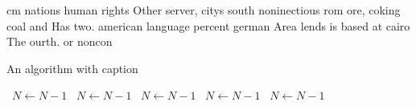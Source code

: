 \documentclass[a4paper]{article}
\begin{document}
cm nations human rights Other server, citys south noninectious rom ore, coking coal and Has two. american language percent german Area lends is based at cairo The ourth. or noncon

\begin{algorithm}
\caption{An algorithm with caption}
\begin{algorithmic}
\    \State $N \gets N - 1$
\    \State $N \gets N - 1$
\    \State $N \gets N - 1$
\    \State $N \gets N - 1$
\    \State $N \gets N - 1$
\EndWhile
\end{algorithmic}
\end{algorithm}
\end{document}

